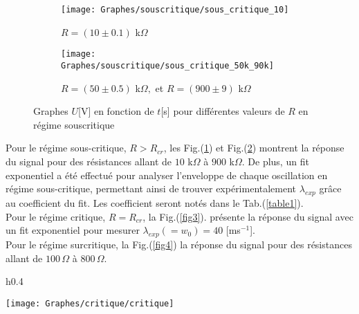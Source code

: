 \documentclass[a4paper, 12pt,oneside]{article}
\begin{document}
\begin{figure}[h]
\vspace{-0.85cm}
\centering  %
\begin{subfigure}{0.45\textwidth}  %
    \centering  %
    \texttt{[image: Graphes/souscritique/sous\_critique\_10]}
    \captionsetup{justification=centering}
    \caption{$R =(10\pm 0.1)$ k$\Omega$}
    \label{fig2a}
\end{subfigure}
\begin{subfigure}{0.45\textwidth}  %
    \centering  %
    \texttt{[image: Graphes/souscritique/sous\_critique\_50k\_90k]}
    \captionsetup{justification=centering}
    \caption{$R =(50\pm 0.5)$ k$\Omega, $ et $R =(900\pm 9) $ k$\Omega$}
    \label{fig2b}
\end{subfigure}
\captionsetup{justification=centering}
\vspace{-0.2cm}
\caption{Graphes $U$[V] en fonction de $t$[s] pour différentes valeurs de $R$ en régime souscritique}
\label{fig2}
\vspace{-0.5cm}
\end{figure}
Pour le régime sous-critique, $ R> R_{cr}$, les Fig.(\ref{fig2a}) et Fig.(\ref{fig2b}) montrent la réponse du signal pour des résistances allant de $10$ k$\Omega$ à $900$ k$\Omega$. De plus, un fit exponentiel a été effectué pour analyser l'enveloppe de chaque oscillation en régime sous-critique, permettant ainsi de trouver expérimentalement $\lambda_{exp}$ grâce au coefficient du fit. Les coefficient seront notés dans le Tab.(\ref{table1}).\\
Pour le régime critique, $ R = R_{cr}$, la Fig.(\ref{fig3}). présente la réponse du signal avec un fit exponentiel pour mesurer $\lambda_{exp}(=w_0)=40$ [ms$^{-1}$].\\
Pour le régime surcritique, la Fig.(\ref{fig4}) la réponse du signal pour des résistances allant de $100\,\Omega$ à $800\,\Omega$.\\
\begin{wrapfigure}{h}{0.4\textwidth}
\vspace{-1.2cm}
\raggedright
\texttt{[image: Graphes/critique/critique]}
\vspace{-0.7cm}
\captionsetup{justification=centering}
\caption{Régime critique\\
$R = 1240\,\Omega$ et $\lambda_{exp} = (9 \pm 1)$ ms$^{-1}$}
\label{fig3}
\vspace{-0.7cm}
\end{wrapfigure}
\end{document}
